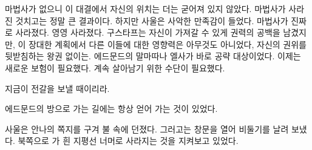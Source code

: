 마법사가 없으니 이 대결에서 자신의 위치는 더는 굳어져 있지 않았다. 마법사가 사라진 것치고는 정말 큰 결과이다. 하지만 사울은 사악한 만족감이 들었다. 마법사가 진짜로 사라졌다. 영영 사라졌다. 구스타프는 자신이 가져갈 수 있게 권력의 공백을 남겼지만, 이 장대한 계획에서 다른 이들에 대한 영향력은 아무것도 아니었다, 자신의 권위를 뒷받침하는 왕권 없이는. 에드문드의 말마따나 엘사가 바로 공략 대상이었다. 이제는 새로운 보험이 필요했다. 계속 살아남기 위한 수단이 필요했다.

지금이 전갈을 보낼 때이리라.

에드문드의 방으로 가는 길에는 항상 얻어 가는 것이 있었다.

사울은 안나의 쪽지를 구겨 불 속에 던졌다. 그러고는 창문을 열어 비둘기를 날려 보냈다. 북쪽으로 가 흰 지평선 너머로 사라지는 것을 지켜보고 있었다.

